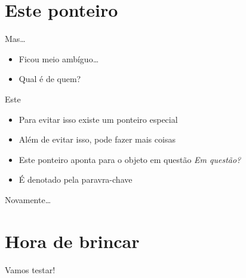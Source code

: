 \documentclass[14pt]{beamer}
\begin{document}
		
	\section{Este ponteiro}
		\begin{frame}{Mas\dots}
			\begin{itemize}
				\presentationPause\item Ficou meio ambíguo\dots
			\end{itemize}
			\presentationPause
			\presentationPause
			\begin{itemize}
				\presentationPause\item Qual  é de quem?
			\end{itemize}
		\end{frame}

		\begin{frame}{Este}
			\begin{itemize}
				\presentationPause\item Para evitar isso existe um ponteiro especial
				\presentationPause\item Além de evitar isso, pode fazer mais coisas
				\presentationPause\item Este ponteiro aponta para o objeto em questão \presentationPause\textit{Em questão?}
				\presentationPause\item É denotado pela paravra-chave 
			\end{itemize}
			\presentationPause
		\end{frame}

		\begin{frame}{Novamente\dots}
			\presentationPause
		\end{frame}
	

	\section{Hora de brincar}
		\begin{frame}
			\begin{center}\Huge
				Vamos testar!
			\end{center}
		\end{frame}
	
\end{document}
